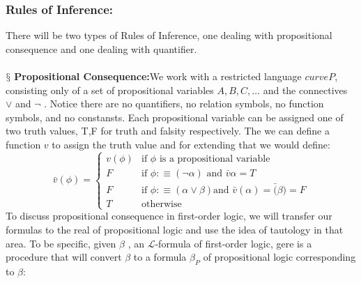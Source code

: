 \documentclass[10pt,a4paper]{article}
\newcommand{\newpoint}[1]{\indent$\mathsection$ \textbf{#1}}
\newcommand{\curveL}{\mathcal{L}}
\begin{document}
                        \subsubsection{Rules of Inference:}
                            There will be two types of Rules of Inference, one dealing with propositional consequence and one dealing with quantifier.
                            \\
                            \\
                            \newpoint{Propositional Consequence:}We work with a restricted language $curveP$, consisting only of a set of propositional variables $A,B,C,\dots$ and the connectives $\lor$ and $\neg$ . Notice there are no quantifiers, no relation symbols, no function symbols, and no constansts. Each propositional variable can be assigned one of two truth values, T,F for truth and falsity respectively. The we can define a function $v$ to assign the truth value and for extending that we would define:
                            \begin{equation}
                                \bar v(\phi) = \left\{
                                \begin{matrix}
                                    v(\phi) &\text{if } \phi \text{ is a propositional variable}
                                    \\
                                    F & \text{if } \phi:\equiv(\neg\alpha) \text{ and } \bar v{\alpha} = T
                                    \\
                                    F & \text{if } \phi:\equiv(\alpha\lor\beta) \text{and } \bar v(\alpha) = \bar (\beta) = F
                                    \\
                                    T & \text{otherwise}
                                \end{matrix}
                                \right.
                            \end{equation}
                            To discuss propositional consequence in first-order logic, we will transfer our formulas to the real of propositional logic and use the idea of tautology in that area. To be specific, given $\beta$ , an $\curveL$-formula of first-order logic, gere is a procedure that will convert $\beta$ to a formula $\beta_P$ of propositional logic corresponding to $\beta$:
\end{document}
